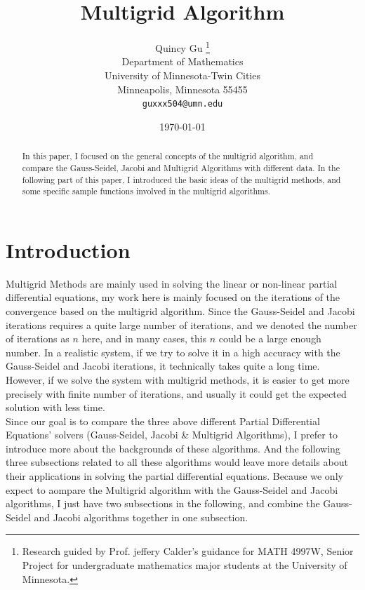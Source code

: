 \documentclass [a4paper, 12pt]{article}
\begin{document}
\title{Multigrid Algorithm}

\author{Quincy Gu \thanks {Research guided by 
Prof. jeffery Calder's guidance for MATH 4997W, Senior Project for undergraduate mathematics major students at the 
University of Minnesota.} \\
Department of Mathematics \\
University of Minnesota-Twin Cities \\
Minneapolis, Minnesota 55455 \\
\texttt {guxxx504@umn.edu}}

\date{\today}

\maketitle

\begin {abstract}

In this paper, I focused on the general concepts of the multigrid algorithm, and compare the Gauss-Seidel, Jacobi and Multigrid Algorithms with different data. In the following part of this paper, I introduced the basic ideas of the multigrid methods, and some specific sample functions involved in the multigrid algorithms.

\end {abstract}

\section {Introduction} \label {S:intro}

Multigrid Methods are mainly used in solving the linear or non-linear partial differential equations, my work here is mainly focused on the iterations of the convergence based on the multigrid algorithm. Since the Gauss-Seidel and Jacobi iterations requires a quite large number of iterations, and we denoted the number of iterations as $n$ here, and in many cases, this $n$ could be a large enough number. In a realistic system, if we try to solve it in a high accuracy with the Gauss-Seidel and Jacobi iterations, it technically takes quite a long time. However, if we solve the system with multigrid methods, it is easier to get more precisely with finite number of iterations, and usually it could get the expected solution with less time. \\
Since our goal is to compare the three above different Partial Differential Equations' solvers (Gauss-Seidel, Jacobi \& Multigrid Algorithms), I prefer to introduce more about the backgrounds of these algorithms. And the following three subsections related to all these algorithms would leave more details about their applications in solving the partial differential equations. Because we only expect to aompare the Multigrid algorithm with the Gauss-Seidel and Jacobi algorithms, I just have two subsections in the following, and combine the Gauss-Seidel and Jacobi algorithms together in one subsection.
\end{document}
